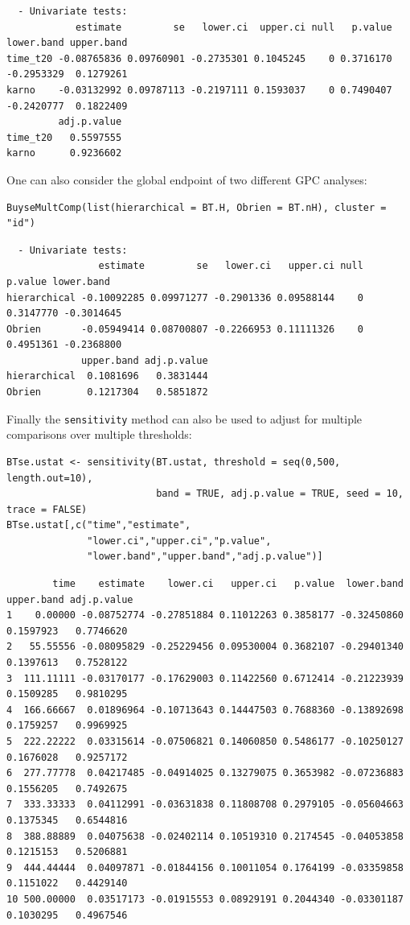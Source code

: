 \documentclass[12pt]{article}
\begin{document}
\begin{verbatim}
  - Univariate tests:
            estimate         se   lower.ci  upper.ci null   p.value lower.band upper.band
time_t20 -0.08765836 0.09760901 -0.2735301 0.1045245    0 0.3716170 -0.2953329  0.1279261
karno    -0.03132992 0.09787113 -0.2197111 0.1593037    0 0.7490407 -0.2420777  0.1822409
         adj.p.value
time_t20   0.5597555
karno      0.9236602
\end{verbatim}


One can also consider the global endpoint of two different GPC analyses:
\lstset{language=r,label= ,caption= ,captionpos=b,numbers=none}
\begin{lstlisting}
BuyseMultComp(list(hierarchical = BT.H, Obrien = BT.nH), cluster = "id")
\end{lstlisting}

\begin{verbatim}
  - Univariate tests:
                estimate         se   lower.ci   upper.ci null   p.value lower.band
hierarchical -0.10092285 0.09971277 -0.2901336 0.09588144    0 0.3147770 -0.3014645
Obrien       -0.05949414 0.08700807 -0.2266953 0.11111326    0 0.4951361 -0.2368800
             upper.band adj.p.value
hierarchical  0.1081696   0.3831444
Obrien        0.1217304   0.5851872
\end{verbatim}


Finally the \texttt{sensitivity} method can also be used to adjust for
multiple comparisons over multiple thresholds:
\lstset{language=r,label= ,caption= ,captionpos=b,numbers=none}
\begin{lstlisting}
BTse.ustat <- sensitivity(BT.ustat, threshold = seq(0,500, length.out=10),
                          band = TRUE, adj.p.value = TRUE, seed = 10, trace = FALSE)
BTse.ustat[,c("time","estimate",
              "lower.ci","upper.ci","p.value",
              "lower.band","upper.band","adj.p.value")]
\end{lstlisting}

\begin{verbatim}
        time    estimate    lower.ci   upper.ci   p.value  lower.band upper.band adj.p.value
1    0.00000 -0.08752774 -0.27851884 0.11012263 0.3858177 -0.32450860  0.1597923   0.7746620
2   55.55556 -0.08095829 -0.25229456 0.09530004 0.3682107 -0.29401340  0.1397613   0.7528122
3  111.11111 -0.03170177 -0.17629003 0.11422560 0.6712414 -0.21223939  0.1509285   0.9810295
4  166.66667  0.01896964 -0.10713643 0.14447503 0.7688360 -0.13892698  0.1759257   0.9969925
5  222.22222  0.03315614 -0.07506821 0.14060850 0.5486177 -0.10250127  0.1676028   0.9257172
6  277.77778  0.04217485 -0.04914025 0.13279075 0.3653982 -0.07236883  0.1556205   0.7492675
7  333.33333  0.04112991 -0.03631838 0.11808708 0.2979105 -0.05604663  0.1375345   0.6544816
8  388.88889  0.04075638 -0.02402114 0.10519310 0.2174545 -0.04053858  0.1215153   0.5206881
9  444.44444  0.04097871 -0.01844156 0.10011054 0.1764199 -0.03359858  0.1151022   0.4429140
10 500.00000  0.03517173 -0.01915553 0.08929191 0.2044340 -0.03301187  0.1030295   0.4967546
\end{verbatim}
\end{document}

